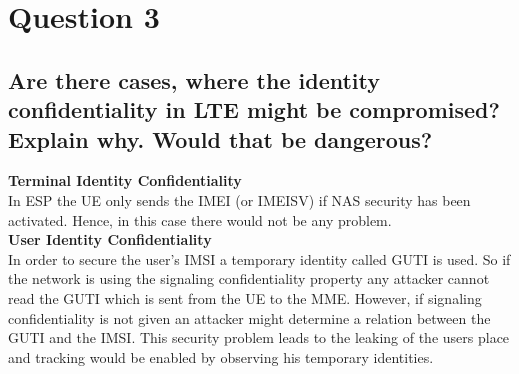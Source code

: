 \documentclass{report}
\begin{document}
	\section{Question 3}
	\startsection
		\renewcommand{\thesubsection}{\thesection.\Alph{subsection}}
		\subsection{Are there cases, where the identity confidentiality in LTE might be compromised? Explain why. Would that be dangerous?}
		\startsubsection
			\textbf{Terminal Identity Confidentiality} \\
			In ESP the UE only sends the IMEI (or IMEISV) if NAS security has been activated. Hence, in this case there would not be any problem. \\
			\textbf{User Identity Confidentiality} \\
			In order to secure the user's IMSI a temporary identity called GUTI is used. So if the network is using the signaling confidentiality property any attacker cannot read the GUTI which is sent from the UE to the MME. However, if signaling confidentiality is not given an attacker might determine a relation between the GUTI and the IMSI. This security problem leads to the leaking of the users place and tracking would be enabled by observing his temporary identities.
		\closesection
	\closesection
\end{document}
